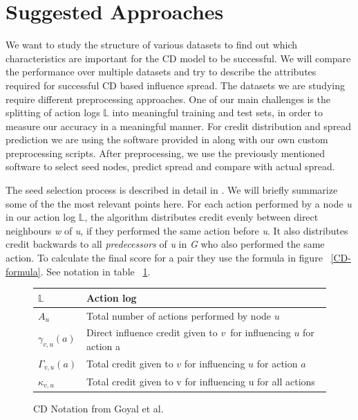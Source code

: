 \documentclass{acm_proc_article-sp}
\begin{document}
\section{Suggested Approaches}

We want to study the structure of various datasets to find out which characteristics are important for the CD model to be successful. We will compare the performance over multiple datasets and try to describe the attributes required for successful CD based influence spread. The datasets we are studying require different preprocessing approaches. One of our main challenges is the splitting of action logs $\mathbb{L}$ into meaningful training and test sets, in order to measure our accuracy in a meaningful manner. For credit distribution and spread prediction we are using the software provided in \cite{goyal:datainfluence} along with our own custom preprocessing scripts. After preprocessing, we use the previously mentioned software to select seed nodes, predict spread and compare with actual spread.

The seed selection process is described in detail in \cite{goyal:datainfluence}. We will briefly summarize some of the the most relevant points here. For each action performed by a node \textit{u} in our action log $\mathbb{L}$, the algorithm distributes credit evenly between direct neighbours \textit{w} of \textit{u}, if they performed the same action before \textit{u}. It also distributes credit backwards to all \textit{predecessors} of \textit{u} in \textit{G} who also performed the same action. To calculate the final score for a pair they use the formula in figure ~\ref{CD-formula}. See notation in table ~\ref{notation2}.

\begin{figure}[h]
	\begin{tabulary}{\linewidth}{|l|L|}
			\hline
			$\mathbb{L}$ & Action log \\\hline
			$A_u$ & Total number of actions performed by node $u$ \\\hline
			$\gamma_{v,u}(a)$ & Direct influence credit given to $v$ for influencing $u$ for action a \\\hline
			$\Gamma_{v,u}(a)$ & Total credit given to $v$ for influencing $u$ for action $a$ \\\hline
			$\kappa_{v,u}$ & Total credit given to v for influencing u for all actions \\\hline
	\end{tabulary}
	\caption{CD Notation from Goyal et al. \cite{goyal:datainfluence}}
	\label{notation2}
\end{figure}
\end{document}
